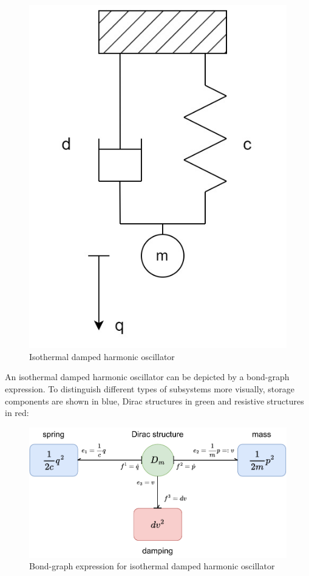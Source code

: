 \documentclass[
	parskip, 			   %
	twoside, 			   %
	DIV=14, 			   %
	BCOR=15.0mm, 		   %
	headsepline, 		   %
	open=right, 		   %
	captions=tableheading, %
	bibliography=totoc,    %
	numbers=noenddot       %
]{scrreprt}
\begin{document}
\clearpage
\begin{figure}[h!]
    \centering
    \includegraphics[scale=0.3]{figures/isothermal damped harmonic oscillator.jpg}
    \caption{Isothermal damped harmonic oscillator}
    \label{fig:idho}
\end{figure}

An isothermal damped harmonic oscillator can be depicted by a bond-graph expression. To distinguish different types of subsystems more visually, storage components are shown in blue, Dirac structures in green and resistive structures in red:

\begin{figure}[h!]
    \centering
    \includegraphics[scale=0.8]{figures/bondgraph_idho.pdf}
    \caption{Bond-graph expression for isothermal damped harmonic oscillator}
    \label{fig:bondgraph_idho}
\end{figure}
\end{document}
